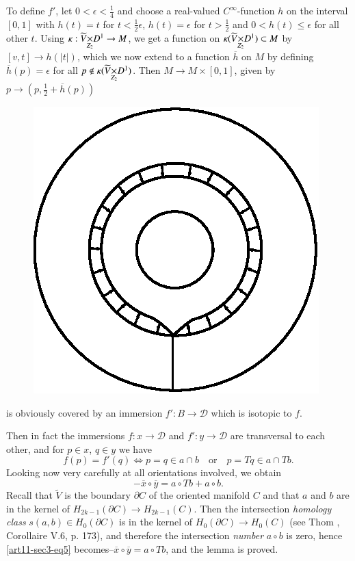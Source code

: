 To define $f'$, let $0<\epsilon <\frac{1}{4}$ and choose a real-valued $C^{\infty}$-function $h$ on the interval $[0,1]$ with $h(t)=t$ for $t<\frac{1}{2}\epsilon$, $h(t)=\epsilon$ for $t>\frac{1}{2}$ and $0<h(t)\leq \epsilon$ for all other $t$. Using $\kappa : \fprod{\widetilde{V}}{D^{1}}{Z_{2}}\to M$, we get a function on $\kappa (\fprod{\widetilde{V}}{D^{1}}{Z_{2}})\subset M$ by $[v,t]\to h(|t|)$, which we now extend to a function $\overline{h}$ on $M$ by defining $\overline{h}(p)=\epsilon$ for all $p\not\in \kappa (\fprod{\widetilde{V}}{D^{1}}{Z_{2}})$. Then $M\to M\times [0,1]$, given by $p\to (p,\frac{1}{2}+\overline{h}(p))$
\begin{figure}[H]
\centering
\includegraphics{src/chap11/fig8.eps}
\end{figure}
is obviously covered by an immersion $f':B\to \mathscr{D}$ which is isotopic to $f$.

Then in fact the immersions $f:x\to \mathscr{D}$ and $f':y\to \mathscr{D}$ are transversal to each other, and for $p\in x$, $q\in y$ we have
$$
f(p)=f'(q)\Leftrightarrow p=q\in a\cap b\text{~~ or~~ } p=Tq\in a\cap Tb.
$$
Looking now very carefully at all orientations involved, we obtain 
\begin{equation*}
-\overline{x}\circ \overline{y}=a\circ Tb+a\circ b.\tag{5}\label{art11-sec3-eq5}
\end{equation*}
Recall that $\widetilde{V}$ is the boundary $\partial C$ of the oriented manifold $C$ and that $a$ and $b$ are in the kernel of $H_{2k-1}(\partial C)\to H_{2k-1}(C)$. Then the intersection {\em homology class} $s(a,b)\in H_{0}(\partial C)$ is in the kernel of $H_{0}(\partial C)\to H_{0}(C)$ (see Thom \cite{art11-key8}, Corollaire V.6, p. 173), and therefore the intersection {\em number} $a\circ b$ is zero, hence \eqref{art11-sec3-eq5} becomes--$\overline{x}\circ \overline{y}=a\circ Tb$, and the lemma is proved.

